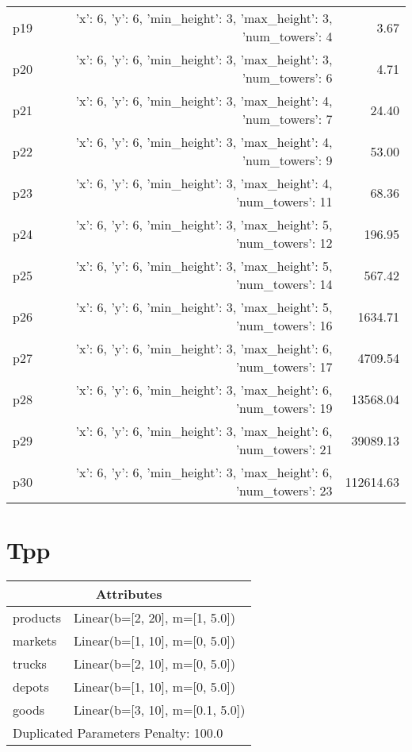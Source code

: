 \documentclass{article}
\begin{document}
\begin{center}
\begin{tabular}{@{}l|r|r@{}}
  p19&{'x': 6, 'y': 6, 'min\_height': 3, 'max\_height': 3, 'num\_towers': 4}&3.67\\
  p20&{'x': 6, 'y': 6, 'min\_height': 3, 'max\_height': 3, 'num\_towers': 6}&4.71\\
  p21&{'x': 6, 'y': 6, 'min\_height': 3, 'max\_height': 4, 'num\_towers': 7}&24.40\\
  p22&{'x': 6, 'y': 6, 'min\_height': 3, 'max\_height': 4, 'num\_towers': 9}&53.00\\
  p23&{'x': 6, 'y': 6, 'min\_height': 3, 'max\_height': 4, 'num\_towers': 11}&68.36\\
  p24&{'x': 6, 'y': 6, 'min\_height': 3, 'max\_height': 5, 'num\_towers': 12}&196.95\\
  p25&{'x': 6, 'y': 6, 'min\_height': 3, 'max\_height': 5, 'num\_towers': 14}&567.42\\
  p26&{'x': 6, 'y': 6, 'min\_height': 3, 'max\_height': 5, 'num\_towers': 16}&1634.71\\
  p27&{'x': 6, 'y': 6, 'min\_height': 3, 'max\_height': 6, 'num\_towers': 17}&4709.54\\
  p28&{'x': 6, 'y': 6, 'min\_height': 3, 'max\_height': 6, 'num\_towers': 19}&13568.04\\
  p29&{'x': 6, 'y': 6, 'min\_height': 3, 'max\_height': 6, 'num\_towers': 21}&39089.13\\
  p30&{'x': 6, 'y': 6, 'min\_height': 3, 'max\_height': 6, 'num\_towers': 23}&112614.63
                            \end{tabular}
                            \end{center}
                    
                            \newpage \section{Tpp}
                    \begin{center}
                    \begin{tabular}{@{}p{}p{}@{}}
                    \multicolumn{2}{c}{\bf \large Attributes}\\\midrule
                    products & Linear(b=[2, 20], m=[1, 5.0])\\
markets & Linear(b=[1, 10], m=[0, 5.0])\\
trucks & Linear(b=[2, 10], m=[0, 5.0])\\
depots & Linear(b=[1, 10], m=[0, 5.0])\\
goods & Linear(b=[3, 10], m=[0.1, 5.0]) \\\midrule
                    \multicolumn{2}{l}{Duplicated Parameters Penalty: 100.0}
                    \end{tabular}
                    \end{center}
                
\end{document}
